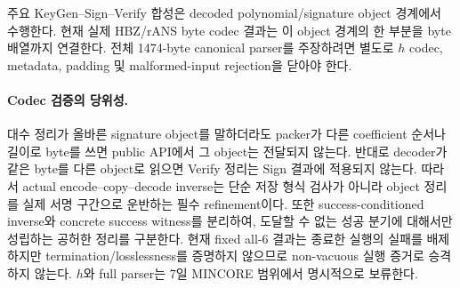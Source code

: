 \begin{scopeboundary}
주요 KeyGen--Sign--Verify 합성은 decoded polynomial/signature object 경계에서
수행한다. 현재 실제 HBZ/rANS byte codec 결과는 이 object 경계의 한 부분을
byte 배열까지 연결한다. 전체 1474-byte canonical parser를 주장하려면 별도로
\(h\) codec, metadata, padding 및 malformed-input rejection을 닫아야 한다.
\end{scopeboundary}

\paragraph{Codec 검증의 당위성.}
대수 정리가 올바른 signature object를 말하더라도 packer가 다른 coefficient
순서나 길이로 byte를 쓰면 public API에서 그 object는 전달되지 않는다. 반대로
decoder가 같은 byte를 다른 object로 읽으면 Verify 정리는 Sign 결과에 적용되지
않는다. 따라서 actual encode--copy--decode inverse는 단순 저장 형식 검사가
아니라 object 정리를 실제 서명 구간으로 운반하는 필수 refinement이다. 또한
success-conditioned inverse와 concrete success witness를 분리하여, 도달할 수
없는 성공 분기에 대해서만 성립하는 공허한 정리를 구분한다. 현재 fixed all-6
결과는 종료한 실행의 실패를 배제하지만 termination/losslessness를 증명하지
않으므로 non-vacuous 실행 증거로 승격하지 않는다. \(h\)와 full parser는 7일
MINCORE 범위에서 명시적으로 보류한다.
